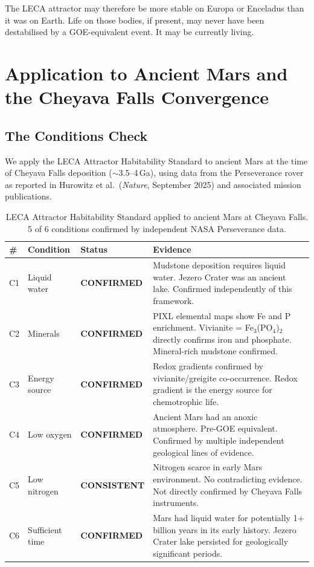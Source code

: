 \documentclass[11pt, a4paper]{article}
\begin{document}
The LECA attractor may therefore be more stable on
Europa or Enceladus than it was on Earth. Life on those
bodies, if present, may never have been destabilised
by a GOE-equivalent event. It may be currently living.

\section{Application to Ancient Mars and the
Cheyava Falls Convergence}

\subsection{The Conditions Check}

We apply the LECA Attractor Habitability Standard to
ancient Mars at the time of Cheyava Falls deposition
($\sim$3.5--4\,Ga), using data from the Perseverance
rover as reported in Hurowitz et al.\
(\textit{Nature}, September 2025) \cite{hurowitz2025}
and associated mission publications.

\begin{table}[h]
\centering
\small
\begin{tabularx}{\linewidth}{p{0.5cm}p{1.8cm}p{2.5cm}X}
\toprule
\textbf{\#} & \textbf{Condition} &
\textbf{Status} & \textbf{Evidence} \\
\midrule
C1 & Liquid water &
  \textbf{CONFIRMED} &
  Mudstone deposition requires liquid water.
  Jezero Crater was an ancient lake.
  Confirmed independently of this framework. \\[0.3em]
C2 & Minerals &
  \textbf{CONFIRMED} &
  PIXL elemental maps show Fe and P enrichment.
  Vivianite = Fe$_3$(PO$_4$)$_2$ directly confirms
  iron and phosphate. Mineral-rich mudstone confirmed. \\[0.3em]
C3 & Energy source &
  \textbf{CONFIRMED} &
  Redox gradients confirmed by vivianite/greigite
  co-occurrence. Redox gradient is the energy source
  for chemotrophic life. \\[0.3em]
C4 & Low oxygen &
  \textbf{CONFIRMED} &
  Ancient Mars had an anoxic atmosphere.
  Pre-GOE equivalent. Confirmed by multiple
  independent geological lines of evidence. \\[0.3em]
C5 & Low nitrogen &
  \textbf{CONSISTENT} &
  Nitrogen scarce in early Mars environment.
  No contradicting evidence.
  Not directly confirmed by Cheyava Falls instruments. \\[0.3em]
C6 & Sufficient time &
  \textbf{CONFIRMED} &
  Mars had liquid water for potentially
  1$+$ billion years in its early history.
  Jezero Crater lake persisted for
  geologically significant periods. \\
\bottomrule
\end{tabularx}
\caption{LECA Attractor Habitability Standard applied
  to ancient Mars at Cheyava Falls.
  5 of 6 conditions confirmed by independent
  NASA Perseverance data.}
\end{table}
\end{document}
